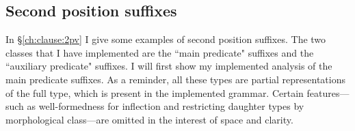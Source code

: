 \begin{comment}
That is, the attribute-value matrix (AVM) for the full predicate complex \textit{=ʔaqƛ=s} in (\ref{ex:2padvpred}) should look something like this:

\ex \label{ex:2pmodavm}
\begin{avm}
\[\asort{clausal-inflection}
   head.pred & + \\
   comp & \< \[ \textsc{head} & +mod \\
 	               mod & \< \[ head.pred & + \\
 	                                    subj & 1sg \\
 	                                    e.tense & future \] \> \] \> \]
\end{avm}
\xe




\ex \label{ex:2pmodrule}
\begin{avm}
\[\asort{clausal-inflection-mod}
 \textsc{head.pred} & + \\
   subj & \avmbox{1} \\
   \textsc{comp} & \< \[ \textsc{head} & +mod \\
 	               \textsc{mod} & \< \[ \textsc{head.pred} & + \\
 	                                    \textsc{subj} & \avmbox{1} \\
 	                                    \textsc{comp} & \avmbox{2} \] \> \] \> $\oplus$ \avmbox{2} \\
   \textsc{dtr} & \textit{clausal-inflection} \]
\end{avm}
\xe
\end{comment}

\subsection{Second position suffixes} \label{ch:clause:analysis:2pv}

In \S\ref{ch:clause:2pv} I give some examples of second position suffixes. The two classes that I have implemented are the ``main predicate" suffixes and the ``auxiliary predicate" suffixes. I will first show my implemented analysis of the main predicate suffixes. As a reminder, all these types are partial representations of the full type, which is present in the implemented grammar. Certain features---such as well-formedness for inflection and restricting daughter types by morphological class---are omitted in the interest of space and clarity.

